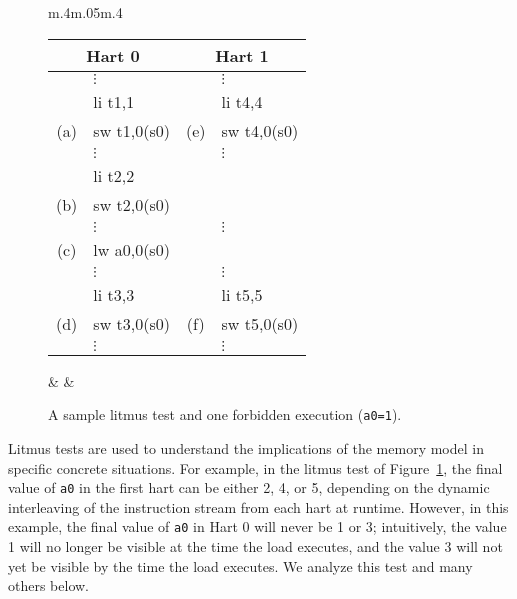 \begin{figure}[h!]
  \centering
    \begin{tabular}{m{.4\linewidth}m{.05\linewidth}m{.4\linewidth}}
    \tt\small
    \begin{tabular}{cl||cl}
    \multicolumn{2}{c}{Hart 0} & \multicolumn{2}{c}{Hart 1} \\
    \hline
          & $\vdots$    &     & $\vdots$    \\
          & li t1,1     &     & li t4,4     \\
      (a) & sw t1,0(s0) & (e) & sw t4,0(s0) \\
          & $\vdots$    &     & $\vdots$    \\
          & li t2,2     &     &             \\
      (b) & sw t2,0(s0) &     &             \\
          & $\vdots$    &     & $\vdots$    \\
      (c) & lw a0,0(s0) &     &             \\
          & $\vdots$    &     & $\vdots$    \\
          & li t3,3     &     & li t5,5     \\
      (d) & sw t3,0(s0) & (f) & sw t5,0(s0) \\
          & $\vdots$    &     & $\vdots$    \\
    \end{tabular}
    & &
    
\end{tabular}
    \caption{A sample litmus test and one forbidden execution ({\tt a0=1}).}
  \label{fig:litmus:sample}
\end{figure}

Litmus tests are used to understand the implications of the memory model in specific concrete situations.
For example, in the litmus test of Figure~\ref{fig:litmus:sample}, the final value of {\tt a0} in the first hart can be either 2, 4, or 5, depending on the dynamic interleaving of the instruction stream from each hart at runtime.
However, in this example, the final value of {\tt a0} in Hart 0 will never be 1 or 3; intuitively, the value 1 will no longer be visible at the time the load executes, and the value 3 will not yet be visible by the time the load executes.
We analyze this test and many others below.

